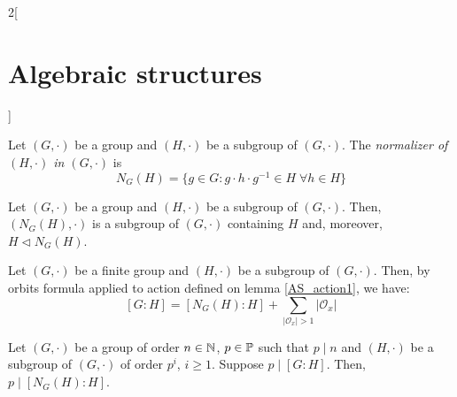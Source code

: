 \documentclass[../../../main.tex]{subfiles}
\begin{document}
\begin{multicols}{2}[\section{Algebraic structures}]
    \begin{definition}
        Let $(G,\cdot)$ be a group and $(H,\cdot)$ be a subgroup of $(G,\cdot)$. The \textit{normalizer of $(H,\cdot)$ in $(G,\cdot)$} is $$N_G(H)=\{g\in G:g\cdot h\cdot g^{-1}\in H\;\forall h\in H\}$$
    \end{definition}
    \begin{lemma}
        Let $(G,\cdot)$ be a group and $(H,\cdot)$ be a subgroup of $(G,\cdot)$. Then, $(N_G(H),\cdot)$ is a subgroup of $(G,\cdot)$ containing $H$ and, moreover, $H\lhd N_G(H)$.
    \end{lemma}
    \begin{corollary}
        Let $(G,\cdot)$ be a finite group and $(H,\cdot)$ be a subgroup of $(G,\cdot)$. Then, by orbits formula applied to action defined on lemma \ref{AS_action1}, we have: $$[G:H]=[N_G(H):H]+\sum_{|\mathcal{O}_x|>1}|\mathcal{O}_x|$$
    \end{corollary}
    \begin{prop}
        Let $(G,\cdot)$ be a group of order $n\in\mathbb{N} $, $p\in\mathbb{P}$ such that $p\mid n$ and $(H,\cdot)$ be a subgroup of $(G,\cdot)$ of order $p^i$, $i\geq 1$. Suppose $p\mid[G:H]$. Then, $p\mid[N_G(H):H]$.
    \end{prop}

\end{multicols}
\end{document}
